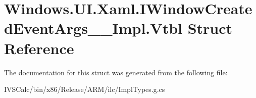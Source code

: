 \hypertarget{struct_windows_1_1_u_i_1_1_xaml_1_1_i_window_created_event_args_____impl_1_1_vtbl}{}\section{Windows.\+U\+I.\+Xaml.\+I\+Window\+Created\+Event\+Args\+\_\+\+\_\+\+Impl.\+Vtbl Struct Reference}
\label{struct_windows_1_1_u_i_1_1_xaml_1_1_i_window_created_event_args_____impl_1_1_vtbl}


The documentation for this struct was generated from the following file\+:\begin{DoxyCompactItemize}
\item 
I\+V\+S\+Calc/bin/x86/\+Release/\+A\+R\+M/ilc/Impl\+Types.\+g.\+cs\end{DoxyCompactItemize}

